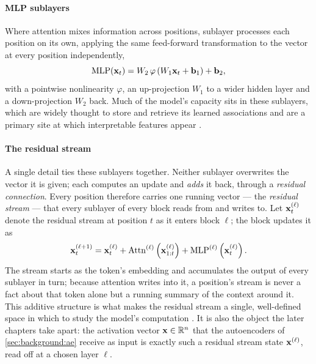     \paragraph{MLP sublayers} Where attention mixes information across
    positions,  sublayer processes each position on its own, applying
    the same feed-forward transformation to the vector at every position
    independently,
    \begin{equation} \label{eq:background:nlp:mlp}
        \operatorname{MLP}(\vb{x}_t) = W_2\,
        \varphi\left(W_1 \vb{x}_t + \vb{b}_1\right) + \vb{b}_2,
    \end{equation}
    with a pointwise nonlinearity $\varphi$, an up-projection $W_1$ to a wider
    hidden layer and a down-projection $W_2$ back. Much of the model's
    capacity sits in these
    sublayers, which are widely thought to store and retrieve its learned
    associations and are a primary site at which interpretable features appear
    \citep{brickenMonosemanticityDecomposingLanguage2023}.

    \paragraph{The residual stream} A single detail ties these sublayers
    together. Neither sublayer overwrites the vector it is given; each computes
    an update and \textit{adds} it back, through a \textit{residual connection}.
    Every position therefore carries one running vector --- the \textit{residual
    stream} --- that every sublayer of every block reads from and writes to.
    Let $\vb{x}^{(\ell)}_{t}$ denote the residual stream at position $t$ as it
    enters block $\ell$; the block updates it as
    \begin{equation} \label{eq:background:nlp:residual}
        \vb{x}^{(\ell+1)}_{t} = \vb{x}^{(\ell)}_{t} +
        \operatorname{Attn}^{(\ell)}\left(\vb{x}^{(\ell)}_{1:t}\right) +
        \operatorname{MLP}^{(\ell)}\left(\vb{x}^{(\ell)}_{t}\right).
    \end{equation}
    The stream starts as the token's
    embedding and accumulates the output of every sublayer in turn; because
    attention writes into it, a position's stream is never a fact about that
    token alone but a running summary of the context around it. This additive
    structure is what makes the residual stream a single, well-defined space in
    which to study the model's computation
    \citep{elhageMathematicalFrameworkTransformer2021}. It is also the object
    the later chapters take apart: the activation vector $\vb{x} \in \mathbb{R}^{n}$
    that the autoencoders of \cref{sec:background:ae}
    receive as input is exactly such a residual stream state $\vb{x}^{(\ell)}$,
    read off at a chosen layer $\ell$.

